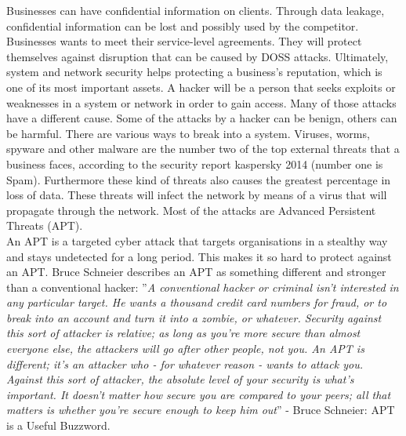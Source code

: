 \documentclass[journal,a4paper]{IEEEtran}
\begin{document}
Businesses can have confidential information on clients. Through data leakage, confidential information can be lost and possibly used by the competitor. Businesses wants to meet their service-level agreements. They will protect themselves against disruption that can be caused by DOSS attacks. Ultimately, system and network security helps protecting a business's reputation, which is one of its most important assets. %
 A hacker will be a person that seeks exploits or weaknesses in a system or network in order to gain access.  Many of those attacks have a different cause. Some of the attacks by a hacker can be benign, others can be harmful. There are various ways to break into a system. Viruses, worms, spyware and other malware are the number two of the top external threats that a business faces, according to the security report kaspersky 2014 \cite{kaspersky} (number one is Spam). Furthermore these kind of threats also causes the greatest percentage in loss of data. These threats will infect the network by means of a virus that will propagate through the network.  Most of the attacks are Advanced Persistent Threats (APT). \\
 
An APT is a targeted cyber attack that targets organisations in a stealthy way and stays undetected for a long period. This makes it so hard to protect against an APT. Bruce Schneier describes an APT as something different and stronger than a conventional hacker: ''\textit{A conventional hacker or criminal isn't interested in any particular target. He wants a thousand credit card numbers for fraud, or to break into an account and turn it into a zombie, or whatever. Security against this sort of attacker is relative; as long as you're more secure than almost everyone else, the attackers will go after other people, not you. An APT is different; it's an attacker who - for whatever reason - wants to attack you. Against this sort of attacker, the absolute level of your security is what's important. It doesn't matter how secure you are compared to your peers; all that matters is whether you're secure enough to keep him out}'' - Bruce Schneier: APT is a Useful Buzzword.\\
\end{document}
